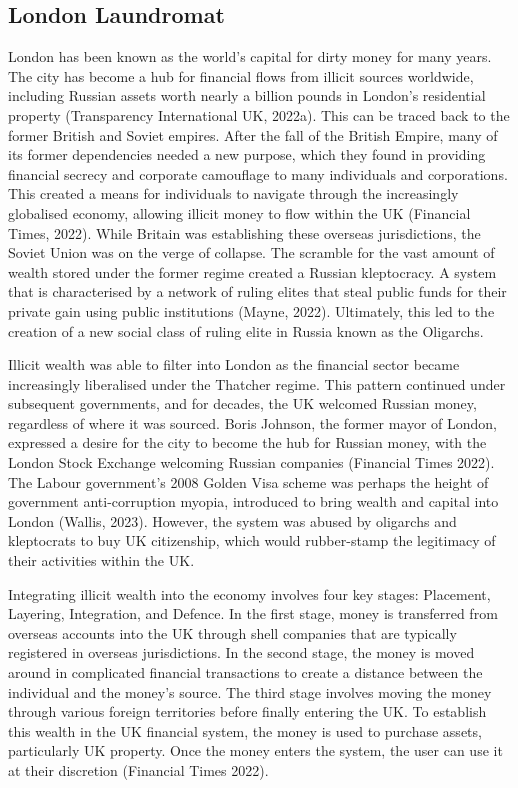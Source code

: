 \documentclass{article}
\begin{document}
\subsection{London Laundromat}
London has been known as the world's capital for dirty money for many years. The city has become a hub for financial flows from illicit sources worldwide, including Russian assets worth nearly a billion pounds in London's residential property (Transparency International UK, 2022a). This can be traced back to the former British and Soviet empires. After the fall of the British Empire, many of its former dependencies needed a new purpose, which they found in providing financial secrecy and corporate camouflage to many individuals and corporations. This created a means for individuals to navigate through the increasingly globalised economy, allowing illicit money to flow within the UK (Financial Times, 2022). While Britain was establishing these overseas jurisdictions, the Soviet Union was on the verge of collapse. The scramble for the vast amount of wealth stored under the former regime created a Russian kleptocracy. A system that is characterised by a network of ruling elites that steal public funds for their private gain using public institutions (Mayne, 2022). Ultimately, this led to the creation of a new social class of ruling elite in Russia known as the Oligarchs.

Illicit wealth was able to filter into London as the financial sector became increasingly liberalised under the Thatcher regime. This pattern continued under subsequent governments, and for decades, the UK welcomed Russian money, regardless of where it was sourced. Boris Johnson, the former mayor of London, expressed a desire for the city to become the hub for Russian money, with the London Stock Exchange welcoming Russian companies (Financial Times 2022). The Labour government's 2008 Golden Visa scheme was perhaps the height of government anti-corruption myopia, introduced to bring wealth and capital into London (Wallis, 2023). However, the system was abused by oligarchs and kleptocrats to buy UK citizenship, which would rubber-stamp the legitimacy of their activities within the UK.

Integrating illicit wealth into the economy involves four key stages: Placement, Layering, Integration, and Defence. In the first stage, money is transferred from overseas accounts into the UK through shell companies that are typically registered in overseas jurisdictions. In the second stage, the money is moved around in complicated financial transactions to create a distance between the individual and the money's source. The third stage involves moving the money through various foreign territories before finally entering the UK. To establish this wealth in the UK financial system, the money is used to purchase assets, particularly UK property. Once the money enters the system, the user can use it at their discretion (Financial Times 2022).
\end{document}
